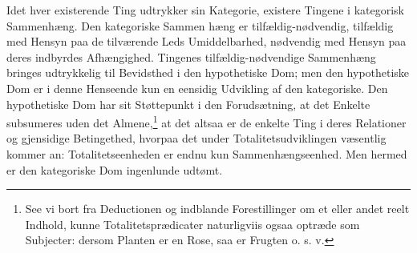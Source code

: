 \documentclass[12pt]{book}
\newcommand{\opage}[1]{\marginnote{\footnotesize\textit{[#1]}}}
\begin{document}
Idet hver existerende Ting udtrykker sin Kategorie, existere
Tingene i kategorisk Sammenhæng. Den kategoriske Sammen%
\opage{64}hæng er tilfældig-nødvendig, tilfældig med Hensyn paa de tilværende
Leds Umiddelbarhed, nødvendig med Hensyn paa
deres indbyrdes Afhængighed. Tingenes tilfældig-nødvendige
Sammenhæng bringes udtrykkelig til Bevidsthed i den hypothetiske
Dom; men den hypothetiske Dom er i denne Henseende
kun en eensidig Udvikling af den kategoriske. Den hypothetiske
Dom har sit Støttepunkt i den Forudsætning, at det Enkelte
subsumeres uden det Almene,\footnote{%
See vi bort fra Deductionen og indblande Forestillinger om et
eller andet reelt Indhold, kunne Totalitetsprædicater naturligviis
ogsaa optræde som Subjecter: dersom Planten er en Rose,
saa er Frugten o. s. v.}
at det altsaa er de enkelte
Ting i deres Relationer og gjensidige Betingethed, hvorpaa
det under Totalitetsudviklingen væsentlig kommer an: Totalitetseenheden
er endnu kun Sammenhængseenhed. Men hermed
er den kategoriske Dom ingenlunde udtømt.
\end{document}
